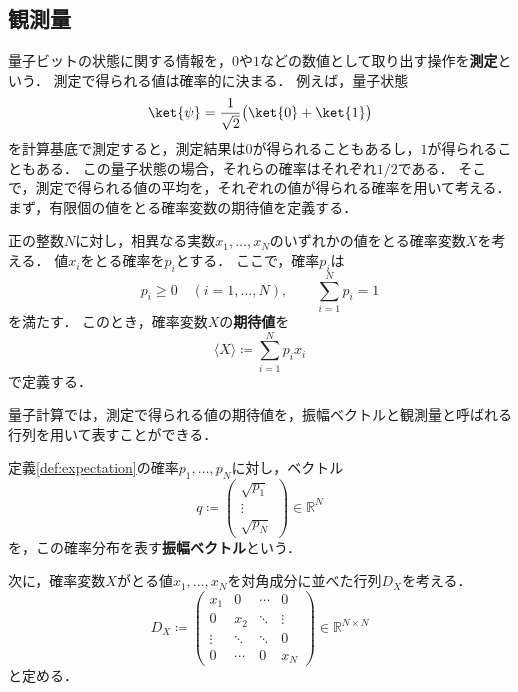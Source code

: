 \subsection{観測量}
\label{subsec:observables}

量子ビットの状態に関する情報を，$0$や$1$などの数値として取り出す操作を\textbf{測定}という．
測定で得られる値は確率的に決まる．
例えば，量子状態
\begin{equation*}
  \ket{\psi}=\frac{1}{\sqrt{2}}\bigl(\ket{0}+\ket{1}\bigr)
\end{equation*}
を計算基底で測定すると，測定結果は$0$が得られることもあるし，$1$が得られることもある．
この量子状態の場合，それらの確率はそれぞれ$1/2$である．
そこで，測定で得られる値の平均を，それぞれの値が得られる確率を用いて考える．
まず，有限個の値をとる確率変数の期待値を定義する．

\begin{defi}[期待値]
\label{def:expectation}
正の整数$N$に対し，相異なる実数$x_1,\ldots,x_N$のいずれかの値をとる確率変数$X$を考える．
値$x_i$をとる確率を$p_i$とする．
ここで，確率$p_i$は
\begin{equation*}
  p_i\geq 0\quad(i=1,\ldots,N),
  \qquad
  \sum_{i=1}^{N}p_i=1
\end{equation*}
を満たす．
このとき，確率変数$X$の\textbf{期待値}を
\begin{equation}
  \langle X\rangle\coloneq\sum_{i=1}^{N}p_i x_i
  \label{eq:expectation-finite-distribution}
\end{equation}
で定義する．
\end{defi}

量子計算では，測定で得られる値の期待値を，振幅ベクトルと観測量と呼ばれる行列を用いて表すことができる．

\begin{defi}[振幅ベクトル]
\label{def:classical-amplitude-vector}
定義\ref{def:expectation}の確率$p_1,\ldots,p_N$に対し，ベクトル
\begin{equation}
  q\coloneq
  \begin{pmatrix}
    \sqrt{p_1}\\
    \vdots\\
    \sqrt{p_N}
  \end{pmatrix}
  \in\mathbb R^N
  \label{eq:classical-amplitude-vector}
\end{equation}
を，この確率分布を表す\textbf{振幅ベクトル}という．
\end{defi}

次に，確率変数$X$がとる値$x_1,\ldots,x_N$を対角成分に並べた行列$D_X$を考える．
\begin{equation}
  D_X\coloneq 
  \begin{pmatrix}
    x_1 & 0 & \cdots & 0\\
    0 & x_2 & \ddots & \vdots\\
    \vdots & \ddots & \ddots & 0\\
    0 & \cdots & 0 & x_N
  \end{pmatrix}
  \in\mathbb R^{N\times N}
  \label{eq:classical-observable-diagonal-matrix}
\end{equation}
と定める．

